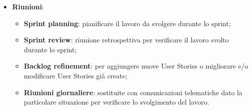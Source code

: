 \begin{itemize}
		\item \textbf{Riunioni}:
	\begin{itemize}
		\item \textbf{Sprint planning}: pianificare il lavoro da svolgere durante lo sprint;
		\item \textbf{Sprint review}: riunione retrospettiva per verificare il lavoro svolto durante lo sprint;
		\item \textbf{Backlog refinement}: per aggiungere nuove User Stories o migliorare e/o modificare User Stories già create;
		\item \textbf{Riunioni giornaliere}: sostituite con comunicazioni telematiche dato la particolare situazione per verificare lo svolgimento del lavoro.
	\end{itemize}
\end{itemize}
